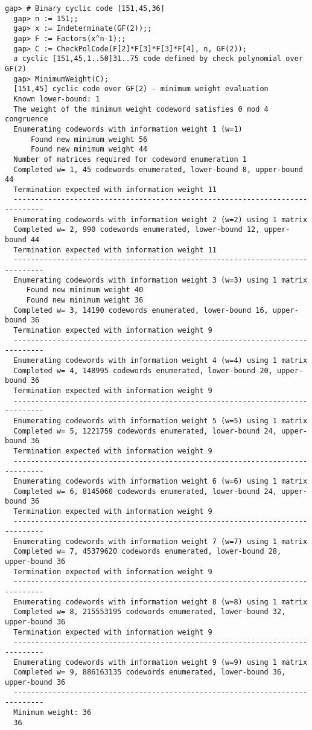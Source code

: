 \documentclass[a4paper,11pt]{report}
\begin{document}
{{\begin{Verbatim}[fontsize=\small,frame=single,label=Example]
  gap> # Binary cyclic code [151,45,36]
  gap> n := 151;;
  gap> x := Indeterminate(GF(2));;
  gap> F := Factors(x^n-1);;
  gap> C := CheckPolCode(F[2]*F[3]*F[3]*F[4], n, GF(2));
  a cyclic [151,45,1..50]31..75 code defined by check polynomial over GF(2)
  gap> MinimumWeight(C);
  [151,45] cyclic code over GF(2) - minimum weight evaluation
  Known lower-bound: 1
  The weight of the minimum weight codeword satisfies 0 mod 4 congruence
  Enumerating codewords with information weight 1 (w=1)
      Found new minimum weight 56
      Found new minimum weight 44
  Number of matrices required for codeword enumeration 1
  Completed w= 1, 45 codewords enumerated, lower-bound 8, upper-bound 44
  Termination expected with information weight 11
  -----------------------------------------------------------------------------
  Enumerating codewords with information weight 2 (w=2) using 1 matrix
  Completed w= 2, 990 codewords enumerated, lower-bound 12, upper-bound 44
  Termination expected with information weight 11
  -----------------------------------------------------------------------------
  Enumerating codewords with information weight 3 (w=3) using 1 matrix
     Found new minimum weight 40
     Found new minimum weight 36
  Completed w= 3, 14190 codewords enumerated, lower-bound 16, upper-bound 36
  Termination expected with information weight 9
  -----------------------------------------------------------------------------
  Enumerating codewords with information weight 4 (w=4) using 1 matrix
  Completed w= 4, 148995 codewords enumerated, lower-bound 20, upper-bound 36
  Termination expected with information weight 9
  -----------------------------------------------------------------------------
  Enumerating codewords with information weight 5 (w=5) using 1 matrix
  Completed w= 5, 1221759 codewords enumerated, lower-bound 24, upper-bound 36
  Termination expected with information weight 9
  -----------------------------------------------------------------------------
  Enumerating codewords with information weight 6 (w=6) using 1 matrix
  Completed w= 6, 8145060 codewords enumerated, lower-bound 24, upper-bound 36
  Termination expected with information weight 9
  -----------------------------------------------------------------------------
  Enumerating codewords with information weight 7 (w=7) using 1 matrix
  Completed w= 7, 45379620 codewords enumerated, lower-bound 28, upper-bound 36
  Termination expected with information weight 9
  -----------------------------------------------------------------------------
  Enumerating codewords with information weight 8 (w=8) using 1 matrix
  Completed w= 8, 215553195 codewords enumerated, lower-bound 32, upper-bound 36
  Termination expected with information weight 9
  -----------------------------------------------------------------------------
  Enumerating codewords with information weight 9 (w=9) using 1 matrix
  Completed w= 9, 886163135 codewords enumerated, lower-bound 36, upper-bound 36
  -----------------------------------------------------------------------------
  Minimum weight: 36
  36
\end{Verbatim}
  

}}
\end{document}
